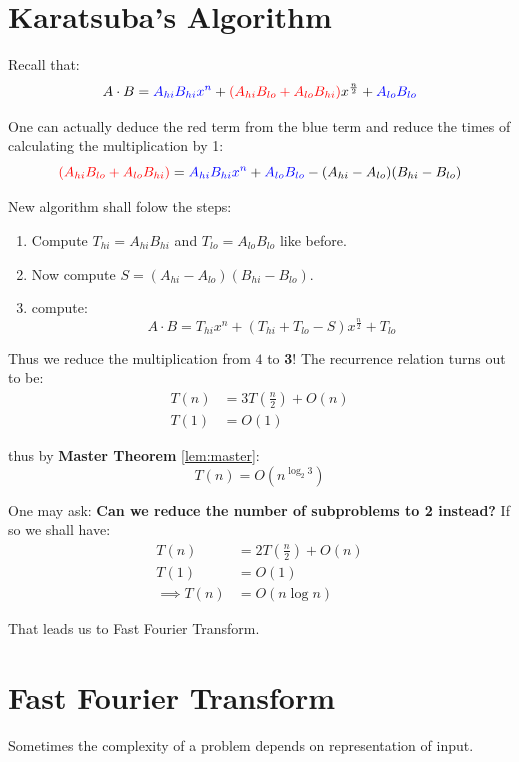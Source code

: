 \section{Karatsuba's Algorithm}

Recall that:
\[
	A\cdot B = \mathcolor{blue}{A_{hi}B_{hi}x^n} + \mathcolor{red}{(A_{hi}B_{lo} + A_{lo}B_{hi})}x^{\frac{n}{2}} + \mathcolor{blue}{A_{lo}B_{lo}}
\]

One can actually deduce the red term from the blue term and reduce the times of calculating the multiplication by 1:
\[
	\mathcolor{red}{(A_{hi}B_{lo} + A_{lo}B_{hi})} = \mathcolor{blue}{A_{hi}B_{hi}x^n} + \mathcolor{blue}{A_{lo}B_{lo}} - (A_{hi} - A_{lo})(B_{hi} - B_{lo})
\]

New algorithm shall folow the steps:
\begin{enumerate}
	\item Compute \( T_{hi} = A_{hi}B_{hi} \) and \( T_{lo} = A_{lo}B_{lo} \) like before.
	\item Now compute \( S = (A_{hi} - A_{lo})(B_{hi} - B_{lo}) \).
	\item compute:
	      \[
		      A\cdot B = T_{hi}x^n + (T_{hi}+T_{lo} - S)x^{\frac{n}{2}} + T_{lo}
	      \]
\end{enumerate}

Thus we reduce the multiplication from \( 4 \) to \textbf{3}! The recurrence relation turns out to be:
\[
	\begin{aligned}
		T(n) & = 3T(\frac{n}{2}) + O(n) \\
		T(1) & = O(1)
	\end{aligned}
\]

thus by \textbf{Master Theorem} \ref{lem:master}:
\[
	T(n) = O(n^{\log_2 3})
\]

One may ask: \textbf{Can we reduce the number of subproblems to 2 instead?} If so we shall have:
\[
	\begin{aligned}
		T(n)          & = 2T(\frac{n}{2}) + O(n) \\
		T(1)          & = O(1)                   \\
		\implies T(n) & = O(n\log n)
	\end{aligned}
\]

That leads us to Fast Fourier Transform.

\section{Fast Fourier Transform}

\begin{remark}[Diversion] \label{rem:representation}
	Sometimes the complexity of a problem depends on representation of input.
\end{remark}

